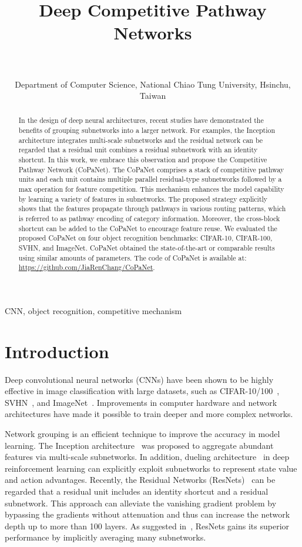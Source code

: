 \documentclass[wcp]{jmlr}
\title[Deep Competitive Pathway Networks]{Deep Competitive Pathway Networks}
\author{\Name{Jia-Ren Chang} \Email{followwar.cs00g@nctu.edu.tw}\\
  \Name{Yong-Sheng Chen} \Email{yschen@cs.nctu.edu.tw}\\
  \addr Department of Computer Science, National Chiao Tung University, Hsinchu, Taiwan}
\begin{document}
\maketitle

\begin{abstract}
In the design of deep neural architectures, recent studies have demonstrated the benefits of grouping subnetworks into a larger network. 
For examples, the Inception architecture integrates multi-scale subnetworks and the residual network can be regarded that a residual unit combines a residual subnetwork with an identity shortcut.
In this work, we embrace this observation and propose the Competitive Pathway Network (CoPaNet).
The CoPaNet comprises a stack of competitive pathway units and each unit contains multiple parallel residual-type subnetworks followed by a max operation for feature competition.
This mechanism enhances the model capability by learning a variety of features in subnetworks.
The proposed strategy explicitly shows that the features propagate through pathways in various routing patterns, which is referred to as pathway encoding of category information.
Moreover, the cross-block shortcut can be added to the CoPaNet to encourage feature reuse.
We evaluated the proposed CoPaNet on four object recognition benchmarks: CIFAR-10, CIFAR-100, SVHN, and ImageNet.
CoPaNet obtained the state-of-the-art or comparable results using similar amounts of parameters. The code of CoPaNet is available at: \url{https://github.com/JiaRenChang/CoPaNet}.
\end{abstract}
\begin{keywords}
CNN, object recognition, competitive mechanism
\end{keywords}

\section{Introduction}
Deep convolutional neural networks (CNNs) have been shown to be highly effective in image classification with large datasets, such as CIFAR-10/100~\citep{krizhevsky2009learning}, SVHN~\citep{netzer2011reading}, and ImageNet~\citep{deng2009imagenet}.
Improvements in computer hardware and network architectures have made it possible to train deeper and more complex networks.


Network grouping is an efficient technique to improve the accuracy in model learning.
The Inception architecture~\citep{szegedy2015going} was proposed to aggregate abundant features via multi-scale subnetworks.
In addition, dueling architecture~\citep{wang2015dueling} in deep reinforcement learning can explicitly exploit subnetworks to represent state value and action advantages.
Recently, the Residual Networks (ResNets)~\citep{he2015deep,he2016identity} can be regarded that a residual unit includes an identity shortcut and a residual subnetwork.
This approach can alleviate the vanishing gradient problem by bypassing the gradients without attenuation and thus can increase the network depth up to more than 100 layers.
As suggested in~\citep{abdi2016multi,huang2016deep,veit2016residual}, ResNets gains its superior performance by implicitly averaging many subnetworks.
\end{document}
